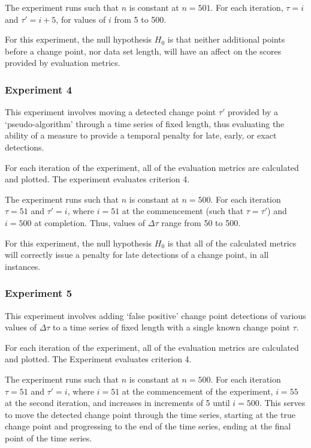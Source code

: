 \documentclass{uvamscse}	%
\begin{document}
The experiment runs such that $n$ is constant at $n=501$. For each iteration, $\tau = i$ and $\tau' = i + 5$, for values of $i$ from 5 to 500.

For this experiment, the null hypothesis $H_0$ is that neither additional points before a change point, nor data set length, will have an affect on the scores provided by evaluation metrics.


\subsubsection{Experiment 4}

This experiment involves moving a detected change point $\tau'$ provided by a `pseudo-algorithm' through a time series of fixed length, thus evaluating the ability of a measure to provide a temporal penalty for late, early, or exact detections.

For each iteration of the experiment, all of the evaluation metrics are calculated and plotted. The experiment evaluates criterion 4.

The experiment runs such that $n$ is constant at $n=500$. For each iteration $\tau = 51$ and $\tau' = i$, where $i = 51$ at the commencement (such that $\tau = \tau'$) and $i = 500$ at completion. Thus, values of $\Delta \tau$ range from 50 to 500.

For this experiment, the null hypothesis $H_0$ is that all of the calculated metrics will correctly issue a penalty for late detections of a change point, in all instances.

\subsubsection{Experiment 5}

This experiment involves adding `false positive' change point detections of various values of $\Delta \tau$ to a time series of fixed length with a single known change point $\tau$.

For each iteration of the experiment, all of the evaluation metrics are calculated and plotted. The Experiment evaluates criterion 4.

The experiment runs such that $n$ is constant at $n=500$. For each iteration $\tau = 51$ and $\tau' = i$, where $i = 51$ at the commencement of the experiment, $i=55$ at the second iteration, and increases in increments of 5 until $i = 500$. This serves to move the detected change point through the time series, starting at the true change point and progressing to the end of the time series, ending at the final point of the time series.
\end{document}
